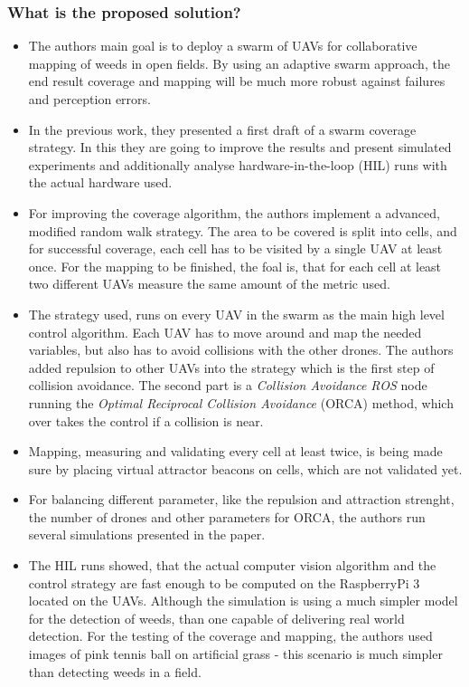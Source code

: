 \subsubsection*{What is the proposed solution?}
\begin{itemize}
    \item The authors main goal is to deploy a swarm of UAVs for collaborative mapping of weeds in open fields. By using an adaptive swarm approach, the end result coverage and mapping will be much more robust against failures and perception errors.
    \item In the previous work, they presented a first draft of a swarm coverage strategy. In this they are going to improve the results and present simulated experiments and additionally analyse hardware-in-the-loop (HIL) runs with the actual hardware used.
    \item For improving the coverage algorithm, the authors implement a advanced, modified random walk strategy. The area to be covered is split into cells, and for successful coverage, each cell has to be visited by a single UAV at least once. For the mapping to be finished, the foal is, that for each cell at least two different UAVs measure the same amount of the metric used.
    \item The strategy used, runs on every UAV in the swarm as the main high level control algorithm. Each UAV has to move around and map the needed variables, but also has to avoid collisions with the other drones. The authors added repulsion to other UAVs into the strategy which is the first step of collision avoidance. The second part is a \emph{Collision Avoidance ROS} node running the \emph{Optimal Reciprocal Collision Avoidance} (ORCA) method, which over takes the control if a collision is near. 
    \item Mapping, measuring and validating every cell at least twice, is being made sure by placing virtual attractor beacons on cells, which are not validated yet.
    \item For balancing different  parameter, like the repulsion and attraction strenght, the number of drones and other parameters for ORCA, the authors run several simulations presented in the paper.
    \item The HIL runs showed, that the actual computer vision algorithm and the control strategy are fast enough to be computed on the RaspberryPi 3 located on the UAVs. Although the simulation is using a much simpler model for the detection of weeds, than one capable of delivering real world detection. For the testing of the coverage and mapping, the authors used images of pink tennis ball on artificial grass - this scenario is much simpler than detecting weeds in a field.
\end{itemize}

